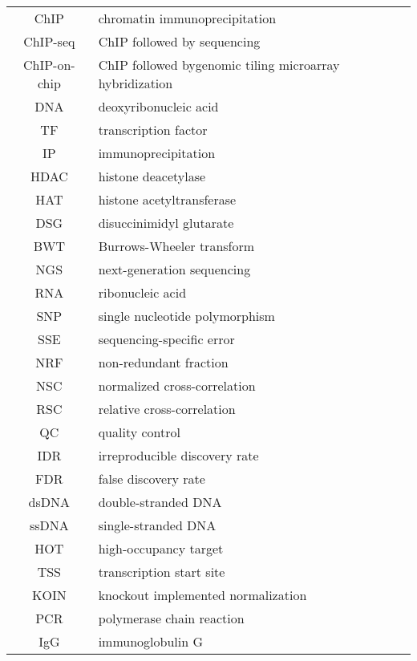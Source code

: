 \documentclass[12pt,a4paper]{report}
\begin{document}



\tableofcontents


\begin{tabular}{c l}
	ChIP & chromatin immunoprecipitation \\
	ChIP-seq & ChIP followed by sequencing \\
	ChIP-on-chip & ChIP followed bygenomic tiling microarray hybridization \\
	DNA & deoxyribonucleic acid \\
	TF & transcription factor \\
	IP & immunoprecipitation \\
	HDAC & histone deacetylase \\
	HAT & histone acetyltransferase \\
	DSG & disuccinimidyl glutarate \\
	BWT & Burrows-Wheeler transform \\
	NGS & next-generation sequencing \\
	RNA & ribonucleic acid \\
	SNP & single nucleotide polymorphism \\
	SSE & sequencing-specific error \\
	NRF & non-redundant fraction \\
	NSC & normalized cross-correlation \\
	RSC & relative cross-correlation \\
	QC & quality control \\
	IDR & irreproducible discovery rate \\
	FDR & false discovery rate \\
	dsDNA & double-stranded DNA \\
	ssDNA & single-stranded DNA \\
	HOT & high-occupancy target \\
	TSS & transcription start site \\
	KOIN & knockout implemented normalization \\
	PCR & polymerase chain reaction \\
	IgG & immunoglobulin G \\
	
\end{tabular}
\end{document}
